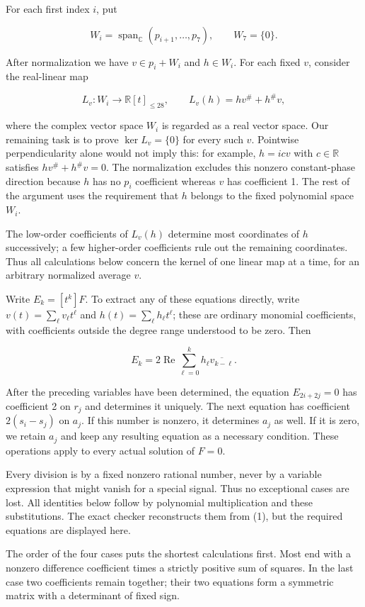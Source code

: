 For each first index \(i\), put

\[
W_i=\operatorname{span}_{\mathbb C}(p_{i+1},\ldots,p_7),\qquad W_7=\{0\}.
\]

After normalization we have \(v\in p_i+W_i\) and \(h\in W_i\). For each
fixed \(v\), consider the real-linear map

\[
L_v:W_i\longrightarrow\mathbb R[t]_{\le28},\qquad
L_v(h)=hv^\#+h^\#v,
\]

where the complex vector space \(W_i\) is regarded as a real vector
space. Our remaining task is to prove \(\ker L_v=\{0\}\) for every such
\(v\). Pointwise perpendicularity alone would not imply this: for
example, \(h=icv\) with \(c\in\mathbb R\) satisfies \(hv^\#+h^\#v=0\).
The normalization excludes this nonzero constant-phase direction because
\(h\) has no \(p_i\) coefficient whereas \(v\) has coefficient 1. The
rest of the argument uses the requirement that \(h\) belongs to the
fixed polynomial space \(W_i\).

The low-order coefficients of \(L_v(h)\) determine most coordinates of
\(h\) successively; a few higher-order coefficients rule out the
remaining coordinates. Thus all calculations below concern the kernel of
one linear map at a time, for an arbitrary normalized average \(v\).

Write \(E_k=[t^k]F\). To extract any of these equations directly, write
\(v(t)=\sum_\ell v_\ell t^\ell\) and \(h(t)=\sum_\ell h_\ell t^\ell\);
these are ordinary monomial coefficients, with coefficients outside the
degree range understood to be zero. Then

\[
E_k=2\operatorname{Re}\sum_{\ell=0}^k
h_\ell\overline{v_{k-\ell}}.
\]

After the preceding variables have been determined, the equation
\(E_{2i+2j}=0\) has coefficient 2 on \(r_j\) and determines it uniquely.
The next equation has coefficient \(2(s_i-s_j)\) on \(a_j\). If this
number is nonzero, it determines \(a_j\) as well. If it is zero, we
retain \(a_j\) and keep any resulting equation as a necessary condition.
These operations apply to every actual solution of \(F=0\).

Every division is by a fixed nonzero rational number, never by a
variable expression that might vanish for a special signal. Thus no
exceptional cases are lost. All identities below follow by polynomial
multiplication and these substitutions. The exact checker reconstructs
them from (1), but the required equations are displayed here.

The order of the four cases puts the shortest calculations first. Most
end with a nonzero difference coefficient times a strictly positive sum
of squares. In the last case two coefficients remain together; their two
equations form a symmetric matrix with a determinant of fixed sign.

